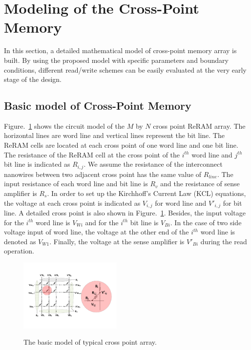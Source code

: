 \vspace{10pt}
\section{Modeling of the Cross-Point Memory}\label{sec:model}

In this section, a detailed mathematical model of cross-point memory array is built. By using the proposed model with specific parameters and
boundary conditions, different read/write schemes can be easily evaluated
at the very early stage of the design.

\subsection{Basic model of Cross-Point Memory}
Figure.~\ref{fig:modeling} shows the circuit model of the $M$ by $N$ cross point ReRAM array. The horizontal lines are word line and vertical lines represent the bit line. The ReRAM cells are located at each cross point of one word line and one bit line. The resistance of the ReRAM cell at the cross point of the $i^{th}$ word line and $j^{th}$ bit line is indicated as $R_{i,j}$. We assume the resistance of the interconnect nanowires between two adjacent cross point has the same value of $R_{line}$. The input resistance of each word line and bit line is $R_v$ and the resistance of sense amplifier is $R_s$. In order to set up the Kirchhoff's Current Law (KCL) equations, the voltage at each cross point is indicated as $V_{i,j}$ for word line and $V'_{i,j}$ for bit line. A detailed cross point is also shown in Figure.~\ref{fig:modeling}. Besides, the input voltage for the $i^{th}$ word line is $V_{Wi}$ and for the $i^{th}$ bit line is $V_{Bi}$. In the case of two side voltage input of word line, the voltage at the other end of the $i^{th}$ word line is denoted as $V_{W1}$. Finally, the voltage at the sense amplifier is $V'_{Bi}$ during the read operation.

\begin{figure}%
\centering
  \includegraphics[width=0.45\textwidth]{./figures/model_reverse.pdf}\\
  \caption{The basic model of typical cross point array.}\label{fig:modeling}
\end{figure}
